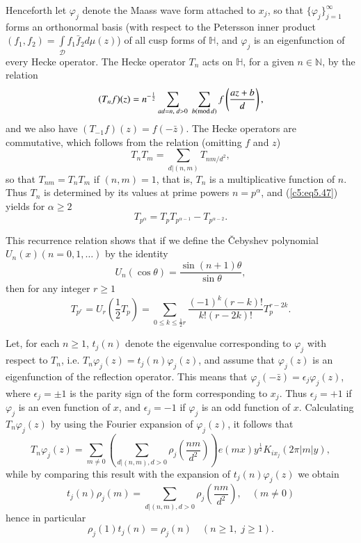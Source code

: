 Henceforth let $\varphi_j$ denote the Maass wave form attached to
$x_j$, so that $\{\varphi_j\}^\infty_{j=1}$ forms an orthonormal basis
(with respect to the Petersson inner product $(f_1, f_2) =
\int\limits_{\mathscr{D}} f_1 \bar{f}_2 d \mu (z)$) of all cusp forms
of $\mathbb{H}$, and $\varphi_j$ is an eigenfunction of every Hecke
operator. The Hecke operator $T_n$ acts on $\mathbb{H}$, for a given
$n \in\mathbb{N}$, by the relation 
$$
(T_n f) (z) = n^{-\frac{1}{2}} \sum\limits_{ad = n, \; d > 0} \; \sum\limits_{b(\text{mod\,} d)} f \left(\frac{az + b}{d} \right),
$$\pageoriginale
and we also have $(T_{-1} f) (z) = f(-\bar{z})$. The Hecke operators are commutative, which follows from the relation (omitting $f$ and $z$) 
\begin{equation}
T_n T_m = \sum\limits_{d|(n,m)} T_{nm/d^2},\label{c5:eq5.47}
\end{equation}
so that $T_{nm} = T_n T_m$ if $(n,m) =1$, that is, $T_n$ is a
multiplicative function of $n$. Thus $T_n$ is determined by its values
at prime powers $n = p^{\alpha}$, and (\ref{c5:eq5.47}) yields for
$\alpha \geq 2$ 
$$
T_{p^\alpha} = T_p T_{p^{\alpha-1}} - T_{p^{\alpha -2}} .
$$

This recurrence  relation shows that if we define the \v Cebyshev
polynomial $U_n(x) (n=0,1,\ldots)$ by the identity 
$$
U_n(\cos \theta) = \frac{\sin (n+1)\theta}{\sin \theta},
$$
then for any integer $r \geq 1$
$$
T_{p^r} = U_r \left(\frac{1}{2} T_p \right)  = \sum\limits_{0\leq k
  \leq \frac{1}{2} r} \frac{(-1)^k (r-k)!}{k!(r-2k)!} T^{r-2k}_p.  
$$

Let, for each $n \geq 1$, $t_j (n)$ denote the eigenvalue
corresponding to $\varphi_j$ with respect to $T_n$, i.e. $T_n
\varphi_j (z) = t_j (n) \varphi_j(z)$, and assume that $\varphi_j(z)$
is an eigenfunction of the reflection operator. This means that
$\varphi_j(-\bar{z}) = \epsilon_j \varphi_j (z)$, where $\epsilon_j =
\pm 1$ is the parity sign of the form corresponding to $x_j$. Thus
$\epsilon_j = +1$ if $\varphi_j$ is an even function of $x$, and
$\epsilon_j = -1$ if $\varphi_j$ is an odd function  of
$x$. Calculating $T_n \varphi_j(z)$ by using the Fourier expansion of
$\varphi_j (z)$, it follows that 
$$
T_n \varphi_j(z) = \sum\limits_{m \neq 0} \left( \sum\limits_{d|(n,m), d > 0} \rho_j \left(\frac{nm}{d^2} \right)\right) e(mx) y^{\frac{1}{2}} K_{ix_j} (2\pi|m|y),
$$
while by comparing this result with the expansion of $t_j(n)
\varphi_j(z)$ we obtain 
$$
t_j(n) \rho_j (m) = \sum\limits_{d|(n,m) , d > 0}  \rho_j \left(
\frac{nm}{d^2}\right), \quad (m \neq 0) 
$$\pageoriginale
hence in particular
$$
\rho_j (1) t_j(n) = \rho_j(n) \quad (n \geq 1, \; j \geq 1).
$$ 

